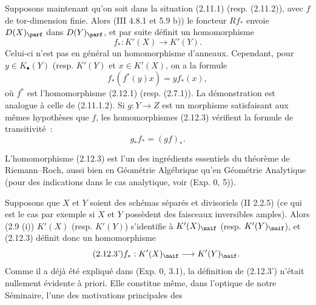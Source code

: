 Supposons maintenant qu'on soit dans la situation (2.11.1) (resp. (2.11.2)), avec \(f\) de tor-dimension finie. Alors (III 4.8.1 et 5.9 b)) le foncteur \(Rf_*\) envoie \(D(X)_{\parf}\) dans \(D(Y)_{\parf}\), et par suite définit un homomorphisme
\begin{equation}\tag{2.12.3}
 f_*:K'(X)\longrightarrow K'(Y).
\end{equation}
Celui-ci n'est pas en général un homomorphisme d'anneaux. Cependant, pour \(y\in K_{\bullet}(Y)\) (resp. \(K'(Y)\) et \(x\in K'(X)\), on a la formule
\begin{equation}\tag{2.12.4}
 f_*(f^*(y)x)=y f_*(x),
\end{equation}
où \(f^*\) est l'homomorphisme (2.12.1) (resp. (2.7.1)). La démonstration est analogue à celle de (2.11.1.2). Si \(g:Y\to Z\) est un morphisme satisfaisant aux mêmes hypothèses que \(f\), les homomorphismes (2.12.3) vérifient la formule de transitivité~:
\begin{equation}\tag{2.12.3.1}
 g_*f_*=(gf)_*.
\end{equation}

L'homomorphisme (2.12.3) est l'un des ingrédients essentiels du théorème de Riemann--Roch, aussi bien en Géométrie Algébrique qu'en Géométrie Analytique (pour des indications dans le cas analytique, voir (Exp. 0, 5)).

Supposons que \(X\) et \(Y\) soient des schémas séparés et divisoriels (II 2.2.5) (ce qui est le cas par exemple si \(X\) et \(Y\) possèdent des faisceaux inversibles amples). Alors (2.9 (i)) \(K'(X)\) (resp. \(K'(Y)\)) s'identifie à \(K'(X)_{\naif}\) (resp. \(K'(Y)_{\naif}\)), et (2.12.3) définit donc un homomorphisme
\begin{equation}\tag{2.12.3'}
 f_*:K'(X)_{\naif}\longrightarrow K'(Y)_{\naif}.
\end{equation}
Comme il a déjà été expliqué dans (Exp. 0, 3.1), la définition de (2.12.3') n'était nullement évidente à priori. Elle constitue même, dans l'optique de notre Séminaire, l'une des motivations principales des
